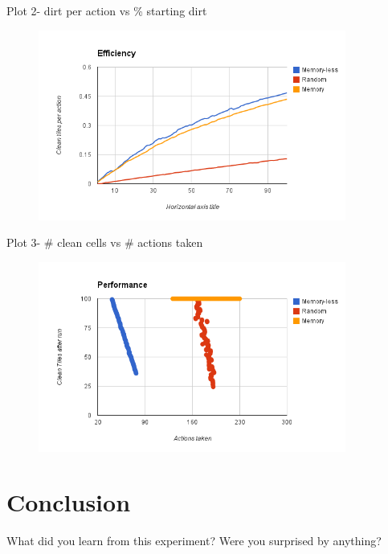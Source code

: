 \documentclass[a4paper,10pt]{article}
\begin{document}
Plot 2- dirt per action vs \% starting dirt
\begin{figure}[H]
	\includegraphics[width=0.9\textwidth]{image1.png}
\end{figure}
Plot 3- \# clean cells vs \# actions taken
\begin{figure}[H]
	\includegraphics[width=0.9\textwidth]{image2.png}
\end{figure}

\section{Conclusion}
What did you learn from this experiment? Were you surprised by anything?
\end{document}
